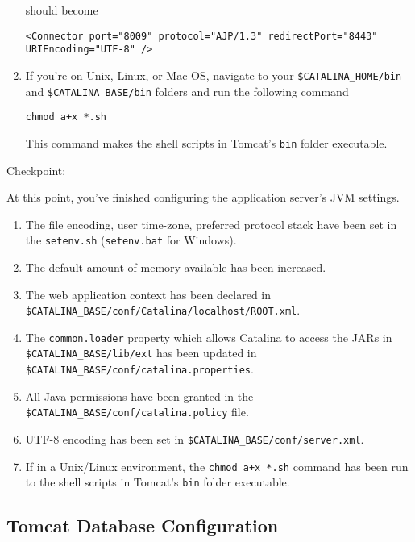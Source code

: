\begin{enumerate}
  should become

\begin{verbatim}
<Connector port="8009" protocol="AJP/1.3" redirectPort="8443" URIEncoding="UTF-8" />
\end{verbatim}
\item
  If you're on Unix, Linux, or Mac OS, navigate to your
  \texttt{\$CATALINA\_HOME/bin} and \texttt{\$CATALINA\_BASE/bin}
  folders and run the following command

\begin{verbatim}
chmod a+x *.sh
\end{verbatim}

  This command makes the shell scripts in Tomcat's \texttt{bin} folder
  executable.
\end{enumerate}

Checkpoint:

At this point, you've finished configuring the application server's JVM
settings.

\begin{enumerate}
\def\labelenumi{\arabic{enumi}.}
\item
  The file encoding, user time-zone, preferred protocol stack have been
  set in the \texttt{setenv.sh} (\texttt{setenv.bat} for Windows).
\item
  The default amount of memory available has been increased.
\item
  The web application context has been declared in
  \texttt{\$CATALINA\_BASE/conf/Catalina/localhost/ROOT.xml}.
\item
  The \texttt{common.loader} property which allows Catalina to access
  the JARs in \texttt{\$CATALINA\_BASE/lib/ext} has been updated in
  \texttt{\$CATALINA\_BASE/conf/catalina.properties}.
\item
  All Java permissions have been granted in the
  \texttt{\$CATALINA\_BASE/conf/catalina.policy} file.
\item
  UTF-8 encoding has been set in
  \texttt{\$CATALINA\_BASE/conf/server.xml}.
\item
  If in a Unix/Linux environment, the \texttt{chmod\ a+x\ *.sh} command
  has been run to the shell scripts in Tomcat's \texttt{bin} folder
  executable.
\end{enumerate}

\subsection{Tomcat Database
Configuration}\label{tomcat-database-configuration}

